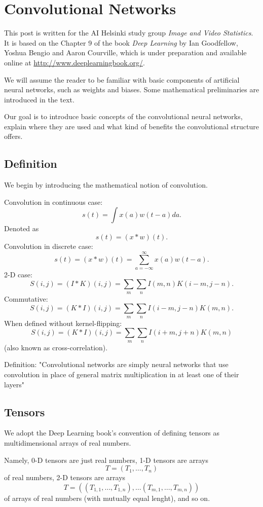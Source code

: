 \documentclass[]{article}
\begin{document}
\section{Convolutional Networks}
This post is written for the AI Helsinki study group \emph{Image and Video Statistics}.
It is based on the Chapter 9 of the book \emph{Deep Learning} by Ian Goodfellow,
Yoshua Bengio and Aaron Courville, which is under preparation and available
online at \url{http://www.deeplearningbook.org/}.

We will assume the reader to be familiar with basic components of artificial
neural networks, such as weights and biases. Some mathematical preliminaries are
introduced in the text.

Our goal is to introduce basic concepts of the convolutional neural networks,
explain where they are used and what kind of benefits the convolutional
structure offers.


\subsection{Definition}
We begin by introducing the mathematical notion of convolution.

Convolution in continuous case:
\[
s(t) = \int x(a)w(t - a)da.
\]
Denoted as
\[
s(t) = (x * w)(t).
\]
Convolution in discrete case:
\[
s(t) = (x * w)(t) = \sum_{a = -\infty}^{\infty} x(a)w(t - a).
\]
2-D case:
\[
S(i, j) = (I * K)(i, j) = \sum_m \sum_n I(m , n) K(i - m, j - n).
\]
Commutative:
\[
S(i, j) = (K * I)(i, j) = \sum_m \sum_n I(i - m , j - n) K(m, n).
\]
When defined without kernel-flipping:
\[
S(i, j) = (K * I)(i, j) = \sum_m \sum_n I(i + m , j + n) K(m, n)
\]
(also known as cross-correlation).

Definition: "Convolutional networks are simply neural networks that use
convolution in place of general matrix multiplication in at least one of their
layers"

\subsection{Tensors}
We adopt the Deep Learning book's convention of defining tensors as
multidimensional arrays of real numbers.

Namely, 0-D tensors are just real numbers, 1-D tensors are arrays
\[
T = (T_1, \ldots, T_n)
\]
of real numbers, 2-D tensors are arrays
\[
T = ((T_{1,1}, \ldots, T_{1,n}), \ldots (T_{m,1}, \ldots, T_{m,n}))
\]
of arrays of real numbers (with mutually equal lenght), and so on.
\end{document}
